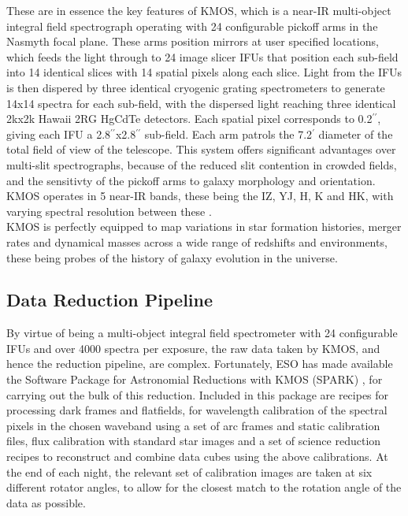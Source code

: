 \documentclass{literature}
\begin{document}
These are in essence the key features of KMOS, which is a near-IR multi-object integral field spectrograph operating with 24 configurable pickoff arms in the Nasmyth focal plane. These arms position mirrors at user specified locations, which feeds the light through to 24 image slicer IFUs that position each sub-field into 14 identical slices with 14 spatial pixels along each slice. Light from the IFUs is then dispered by three identical cryogenic grating spectrometers to generate 14x14 spectra for each sub-field, with the dispersed light reaching three identical 2kx2k Hawaii 2RG HgCdTe detectors. Each spatial pixel corresponds to 0.2$^{\prime \prime}$, giving each IFU a 2.8$^{\prime \prime}$x2.8$^{\prime \prime}$ sub-field. Each arm patrols the 7.2$^{\prime}$ diameter of the total field of view of the telescope. This system offers significant advantages over multi-slit spectrographs, because of the reduced slit contention in crowded fields, and the sensitivty of the pickoff arms to galaxy morphology and orientation. KMOS operates in 5 near-IR bands, these being the IZ, YJ, H, K and HK, with varying spectral resolution between these \citep{Sharples2005}. \\ 

KMOS is perfectly equipped to map variations in star formation histories, merger rates and dynamical masses across a wide range of redshifts and environments, these being probes of the history of galaxy evolution in the universe.  
 

\subsection{Data Reduction Pipeline}\label{sec:reduction}
By virtue of being a multi-object integral field spectrometer with 24 configurable IFUs and over 4000 spectra per exposure, the raw data taken by KMOS, and hence the reduction pipeline, are complex. Fortunately, ESO has made available the Software Package for Astronomial Reductions with KMOS (SPARK) \citep{Davies2013}, for carrying out the bulk of this reduction. Included in this package are recipes for processing dark frames and flatfields, for wavelength calibration of the spectral pixels in the chosen waveband using a set of arc frames and static calibration files, flux calibration with standard star images and a set of science reduction recipes to reconstruct and combine data cubes using the above calibrations. At the end of each night, the relevant set of calibration images are taken at six different rotator angles, to allow for the closest match to the rotation angle of the data as possible. \\ 
\end{document}
